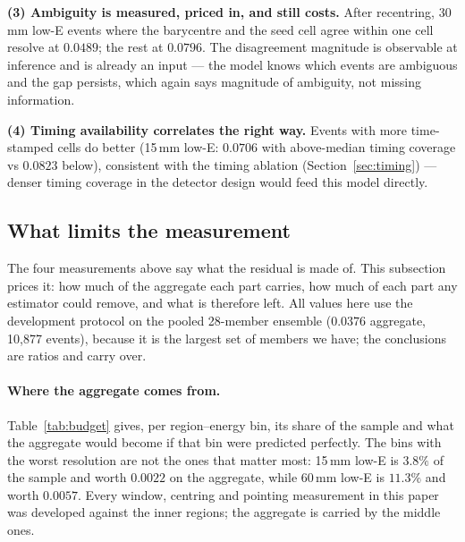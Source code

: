 \documentclass[11pt,a4paper]{article}
\begin{document}
\textbf{(3) Ambiguity is measured, priced in, and still costs.} After
recentring, 30\,mm low-E events where the barycentre and the seed cell
agree within one cell resolve at $0.0489$; the rest at $0.0796$. The
disagreement magnitude is observable at inference and is already an input
--- the model knows which events are ambiguous and the gap persists, which
again says magnitude of ambiguity, not missing information.

\textbf{(4) Timing availability correlates the right way.} Events with more
time-stamped cells do better (15\,mm low-E: $0.0706$ with above-median
timing coverage vs $0.0823$ below), consistent with the timing ablation
(Section~\ref{sec:timing}) --- denser timing coverage in the detector
design would feed this model directly.

\subsection{What limits the measurement}
\label{sec:ceiling}

The four measurements above say what the residual is made of. This subsection
prices it: how much of the aggregate each part carries, how much of each part
any estimator could remove, and what is therefore left. All values here use the
development protocol on the pooled 28-member ensemble ($0.0376$ aggregate,
10{,}877 events), because it is the largest set of members we have; the
conclusions are ratios and carry over.

\paragraph{Where the aggregate comes from.} Table~\ref{tab:budget} gives, per
region--energy bin, its share of the sample and what the aggregate would become
if that bin were predicted perfectly. The bins with the worst resolution are
not the ones that matter most: 15\,mm low-E is $3.8\%$ of the sample and worth
$0.0022$ on the aggregate, while 60\,mm low-E is $11.3\%$ and worth $0.0057$.
Every window, centring and pointing measurement in this paper was developed
against the inner regions; the aggregate is carried by the middle ones.
\end{document}
